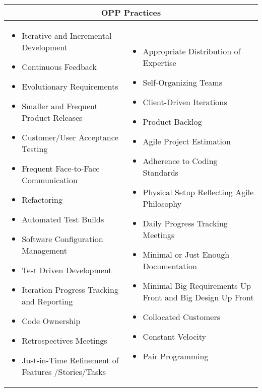 \begin{table}
\begin{tabular}{| p{7.5cm}  p{7.5cm} |}
	\hline
	\multicolumn{2}{|c|}{\textbf{\ac{OPP} Practices}}  \\ \hline
     	\begin{itemize}
     		\item Iterative and Incremental Development 
     		\item Continuous Feedback 
     		\item Evolutionary Requirements 
     		\item Smaller and Frequent Product Releases 
     		\item Customer/User Acceptance Testing 
     		\item Frequent Face-to-Face Communication
     		\item Refactoring 
     		\item Automated Test Builds
     		\item Software Configuration Management 
     		\item Test Driven Development
     		\item Iteration Progress Tracking and Reporting 
     		\item Code Ownership 
     		\item Retrospectives Meetings 
     		\item Just-in-Time Refinement of Features /Stories/Tasks 
     	\end{itemize} 
     	& \begin{itemize}
     	 	\item Appropriate Distribution of Expertise
  			\item Self-Organizing Teams
     		\item Client-Driven Iterations 
     		\item Product Backlog 
     		\item Agile Project Estimation 
     		\item Adherence to Coding Standards 
     		\item Physical Setup Reflecting Agile Philosophy
     		\item Daily Progress Tracking Meetings 
     		\item Minimal or Just Enough Documentation 
     		\item Minimal Big Requirements Up Front and Big Design Up Front 
     		\item Collocated Customers
     		\item Constant Velocity 
     		\item Pair Programming  
 		\end{itemize} 
     \\ \hline
\end{tabular}
\label{table:opp_practices}
\end{table}

